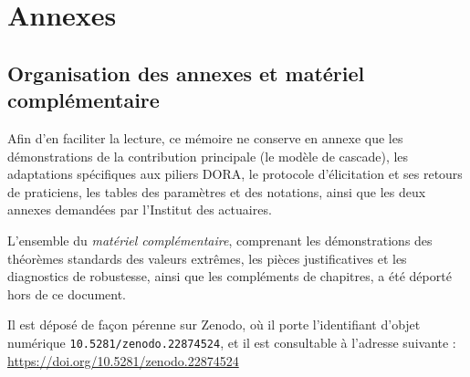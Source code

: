 \documentclass[12pt,a4paper]{report}
\begin{document}
\part*{Annexes}

\chapter*{Organisation des annexes et matériel complémentaire}

Afin d'en faciliter la lecture, ce mémoire ne conserve en annexe que les démonstrations de la
contribution principale (le modèle de cascade), les adaptations spécifiques aux piliers DORA,
le protocole d'élicitation et ses retours de praticiens, les tables des paramètres et des
notations, ainsi que les deux annexes demandées par l'Institut des actuaires.

L'ensemble du \emph{matériel complémentaire}, comprenant les démonstrations des théorèmes
standards des valeurs extrêmes, les pièces justificatives et les diagnostics de robustesse,
ainsi que les compléments de chapitres, a été déporté hors de ce document.

Il est déposé de façon pérenne sur Zenodo, où il porte l'identifiant d'objet numérique
\texttt{10.5281/zenodo.22874524}, et il est consultable à l'adresse suivante :
\url{https://doi.org/10.5281/zenodo.22874524}

\end{document}
